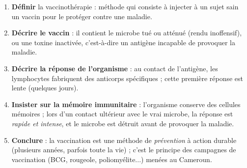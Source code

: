 \documentclass[11pt]{article}
\newcommand{\cle}[1]{{\popxbold\color{popdark}#1}}
\begin{document}
\begin{methode}
\begin{enumerate}
\item \textbf{Définir} la vaccinothérapie : méthode qui consiste à injecter à un sujet sain un vaccin pour le protéger contre une maladie.
\item \textbf{Décrire le vaccin} : il contient le microbe tué ou atténué (rendu inoffensif), ou une toxine inactivée, c'est-à-dire un \cle{antigène} incapable de provoquer la maladie.
\item \textbf{Décrire la réponse de l'organisme} : au contact de l'antigène, les lymphocytes fabriquent des anticorps spécifiques ; cette première réponse est lente (quelques jours).
\item \textbf{Insister sur la mémoire immunitaire} : l'organisme conserve des cellules mémoires ; lors d'un contact ultérieur avec le vrai microbe, la réponse est \emph{rapide et intense}, et le microbe est détruit avant de provoquer la maladie.
\item \textbf{Conclure} : la vaccination est une méthode de \emph{prévention} à action durable (plusieurs années, parfois toute la vie) ; c'est le principe des campagnes de vaccination (BCG, rougeole, poliomyélite...) menées au Cameroun.
\end{enumerate}
\end{methode}
\end{document}
